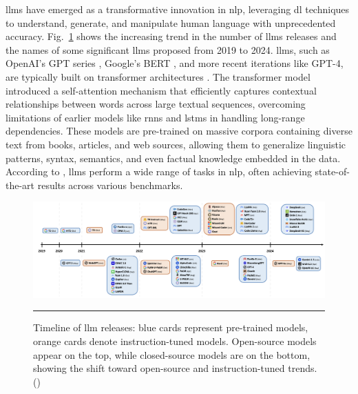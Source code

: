 \glspl{llm} have emerged as a transformative innovation in \gls{nlp}, leveraging \gls{dl} techniques to understand, generate, and manipulate human language with unprecedented accuracy.
Fig.~\ref{fig:llms-over-the-years} shows the increasing trend in the number of \glspl{llm} releases and the names of some significant \glspl{llm} proposed from 2019 to 2024.
\glspl{llm}, such as OpenAI's GPT series \cite{Radford2018ImprovingLU}, Google's BERT \cite{Devlin2019BERTPO}, and more recent iterations like GPT-4, are typically built on transformer architectures \cite{Vaswani2017}.
The transformer model introduced a self-attention mechanism that efficiently captures contextual relationships between words across large textual sequences, overcoming limitations of earlier models like \glspl{rnn} and \glspl{lstm} in handling long-range dependencies.
These models are pre-trained on massive corpora containing diverse text from books, articles, and web sources, allowing them to generalize linguistic patterns, syntax, semantics, and even factual knowledge embedded in the data.
According to \textcite{Chang2024}, \glspl{llm} perform a wide range of tasks in \gls{nlp}, often achieving state-of-the-art results across various benchmarks.

\begin{figure}[htbp]
    \centering
 \includegraphics[width=.9\textwidth]{figures/literature-review/llms-over-the-years.png}
     \rule{35em}{0.5pt}
    \caption{Timeline of \gls{llm} releases: blue cards represent pre-trained models, orange cards denote instruction-tuned models. Open-source models appear on the top, while closed-source models are on the bottom, showing the shift toward open-source and instruction-tuned trends. (\textcite{Naveed2023})}
 \label{fig:llms-over-the-years}
\end{figure}

